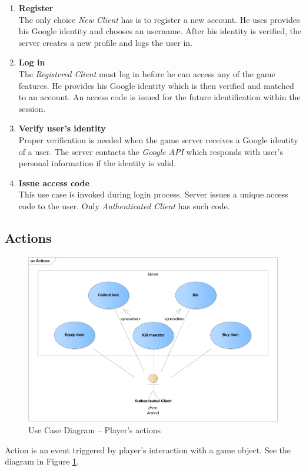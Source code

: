 	\begin{enumerate}
		\item \textbf{Register} \\
		The only choice \textit{New Client} has is to register a new account. He uses provides his Google identity and chooses an username. After his identity is verified, the server creates a new profile and logs the user in.
		
		\item \textbf{Log in} \\
		The \textit{Registered Client} must log in before he can access any of the game features. He provides his Google identity which is then verified and matched to an account. An access code is issued for the future identification within the session.		
		
		\item \textbf{Verify user's identity} \\
		Proper verification is needed when the game server receives a Google identity of a user. The server contacts the \textit{Google API} which responds with user's personal information if the identity is valid.
		
		\item \textbf{Issue access code} \\ 
		This use case is invoked during login process. Server issues a unique access code to the user. Only \textit{Authenticated Client} has such code.
	\end{enumerate}
	
	\subsection{Actions}	
		\begin{figure}[h]	
			\includegraphics[width=\textwidth]{figures/UC_Actions}
			\centering			
			\caption{Use Case Diagram -- Player's actions}
			\label{fig:ucactions}
		\end{figure}
		\noindent Action is an event triggered by player's interaction with a game object. See the diagram in Figure \ref{fig:ucactions}.
		
